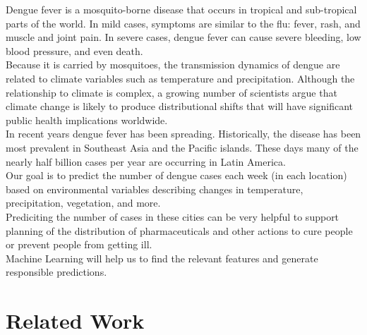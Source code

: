 \documentclass[english]{article}
\begin{document}
Dengue fever is a mosquito-borne disease that occurs in tropical and sub-tropical parts of the world. In mild cases, symptoms are similar to the flu: fever, rash, and muscle and joint pain. In severe cases, dengue fever can cause severe bleeding, low blood pressure, and even death.\\
Because it is carried by mosquitoes, the transmission dynamics of dengue are related to climate variables such as temperature and precipitation. Although the relationship to climate is complex, a growing number of scientists argue that climate change is likely to produce distributional shifts that will have significant public health implications worldwide.\\
In recent years dengue fever has been spreading. Historically, the disease has been most prevalent in Southeast Asia and the Pacific islands. These days many of the nearly half billion cases per year are occurring in Latin America.\\
Our goal is to predict the number of dengue cases each week (in each location) based on environmental variables describing changes in temperature, precipitation, vegetation, and more.\\
Prediciting the number of cases in these cities can be very helpful to support planning of the distribution of pharmaceuticals and other actions to cure people or prevent people from getting ill.\\
Machine Learning will help us to find the relevant features and generate responsible predictions.

\section{Related Work}

\end{document}
